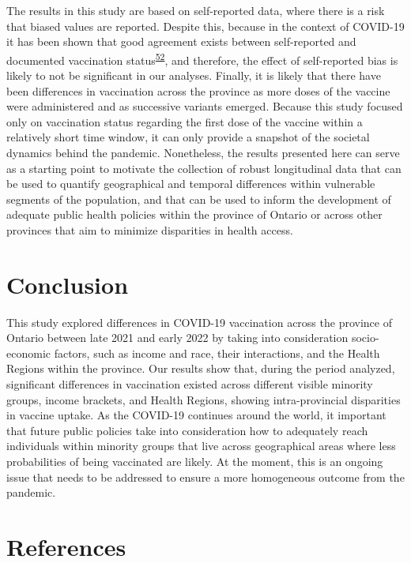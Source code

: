\documentclass[
  letterpaper,
  DIV=11,
  numbers=noendperiod]{scrartcl}
\begin{document}
The results in this study are based on self-reported data, where there
is a risk that biased values are reported. Despite this, because in the
context of COVID-19 it has been shown that good agreement exists between
self-reported and documented vaccination
status\textsuperscript{\protect\hyperlink{ref-stephenson2022}{52}}, and
therefore, the effect of self-reported bias is likely to not be
significant in our analyses. Finally, it is likely that there have been
differences in vaccination across the province as more doses of the
vaccine were administered and as successive variants emerged. Because
this study focused only on vaccination status regarding the first dose
of the vaccine within a relatively short time window, it can only
provide a snapshot of the societal dynamics behind the pandemic.
Nonetheless, the results presented here can serve as a starting point to
motivate the collection of robust longitudinal data that can be used to
quantify geographical and temporal differences within vulnerable
segments of the population, and that can be used to inform the
development of adequate public health policies within the province of
Ontario or across other provinces that aim to minimize disparities in
health access.

\hypertarget{conclusion}{%
\section{Conclusion}\label{conclusion}}

This study explored differences in COVID-19 vaccination across the
province of Ontario between late 2021 and early 2022 by taking into
consideration socio-economic factors, such as income and race, their
interactions, and the Health Regions within the province. Our results
show that, during the period analyzed, significant differences in
vaccination existed across different visible minority groups, income
brackets, and Health Regions, showing intra-provincial disparities in
vaccine uptake. As the COVID-19 continues around the world, it important
that future public policies take into consideration how to adequately
reach individuals within minority groups that live across geographical
areas where less probabilities of being vaccinated are likely. At the
moment, this is an ongoing issue that needs to be addressed to ensure a
more homogeneous outcome from the pandemic.

\hypertarget{references}{%
\section{References}\label{references}}
\end{document}
